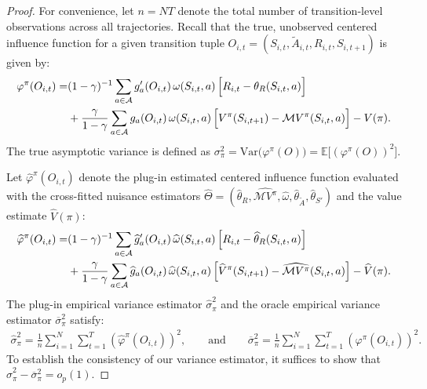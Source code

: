 \documentclass[12pt]{article}
\newcommand{\Var}{{\mbox{Var}}}
\newcommand{\0}{\boldsymbol{0}}
\newcommand{\E}{\mathbb{E}}
\begin{document}
\begin{proof}
For convenience, let $n = NT$ denote the total number of transition-level observations across all trajectories. Recall that the true, unobserved centered influence function for a given transition tuple $O_{i,t} = (S_{i,t}, \widetilde{A}_{i,t}, R_{i,t}, S_{i,t+1})$ is given by:
\begin{align*}
\varphi^\pi(O_{i,t}) = & (1-\gamma)^{-1}\sum_{a\in\mathcal A} g_a'(O_{i,t})\,\omega(S_{i,t},a)\,\Bigl[R_{i,t}-\theta_R(S_{i,t},a)\Bigr] \\
& +\frac{\gamma}{1-\gamma}\sum_{a\in\mathcal A} g_a(O_{i,t})\,\omega(S_{i,t},a)\,\Bigl[V^\pi(S_{i,t+1})-\mathcal{M}V^{\pi}(S_{i,t},a)\Bigr] - V(\pi).
\end{align*}
The true asymptotic variance is defined as $\sigma_\pi^2 = \Var\big(\varphi^\pi(O)\bigr) = \E\big[(\varphi^\pi(O))^2\bigr]$. 

Let $\widehat{\varphi}^\pi(O_{i,t})$ denote the plug-in estimated centered influence function evaluated with the cross-fitted nuisance estimators $\widehat{\Theta} = (\widehat{\theta}_R, \widehat{\mathcal{M}V^\pi}, \widehat{\omega}, \widehat{\theta}_{\widetilde A}, \widehat{\theta}_{S'})$ and the value estimate $\widehat{V}(\pi)$:
\begin{align*}
\widehat{\varphi}^\pi(O_{i,t}) = & (1-\gamma)^{-1}\sum_{a\in\mathcal A} \widehat{g}_a'(O_{i,t})\,\widehat{\omega}(S_{i,t},a)\,\Bigl[R_{i,t}-\widehat{\theta}_R(S_{i,t},a)\Bigr] \\
& +\frac{\gamma}{1-\gamma}\sum_{a\in\mathcal A} \widehat{g}_a(O_{i,t})\,\widehat{\omega}(S_{i,t},a)\,\Bigl[\widehat{V}^\pi(S_{i,t+1})-\widehat{\mathcal{M}V^{\pi}}(S_{i,t},a)\Bigr] - \widehat{V}(\pi).
\end{align*}
The plug-in empirical variance estimator $\widehat{\sigma}_\pi^2$ and the oracle empirical variance estimator $\overline{\sigma}_\pi^2$ satisfy:
\begin{align*}
\widehat{\sigma}_\pi^2 = \frac{1}{n}\sum_{i=1}^N\sum_{t=1}^T \left( \widehat{\varphi}^\pi(O_{i,t}) \right)^2, \qquad \text{and} \qquad \overline{\sigma}_\pi^2 = \frac{1}{n}\sum_{i=1}^N\sum_{t=1}^T \left( \varphi^\pi(O_{i,t}) \right)^2.
\end{align*}
To establish the consistency of our variance estimator, it suffices to show that $\widehat{\sigma}_\pi^2 - \overline{\sigma}_\pi^2 = o_p(1)$.


\end{proof}
\end{document}
